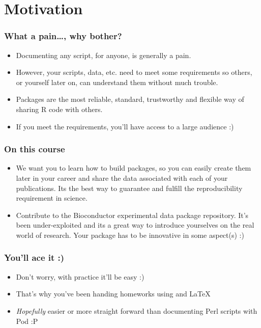 \section{Motivation}

\begin{frame}[allowframebreaks]
  \frametitle{What a pain\ldots, why bother?}
  \begin{itemize}
  \item Documenting any script, for anyone, is generally a \alert{pain}.
  \item However, your scripts, data, etc. need to meet some requirements so others, or yourself later on, can understand them without much trouble.
  \item Packages are the most reliable, standard, \alert{trustworthy} and flexible way of sharing R code with others.
  \item If you meet the requirements, you'll have access to a large audience :)
  \end{itemize}
\end{frame}

\begin{frame}[allowframebreaks]
  \frametitle{On this course}
  \begin{itemize}
  \item We want you to learn how to build packages, so you can easily create them later in your career and share the data associated with each of your publications. Its the best way to guarantee and fulfill the \alert{reproducibility} requirement in science.
  \item Contribute to the Bioconductor experimental data package repository. It's been under-exploited and its a great way to introduce yourselves on the real world of research. Your package has to be \alert{innovative} in some aspect(s) :)
  \end{itemize}
\end{frame}

\begin{frame}[allowframebreaks]
  \frametitle{You'll ace it :)}
  \begin{itemize}
  \item Don't worry, with practice it'll be easy :) 
  \item That's why you've been handing homeworks using  and \LaTeX
  \item \emph{Hopefully} easier or more straight forward than documenting Perl scripts with Pod :P
  \end{itemize}
\end{frame}

